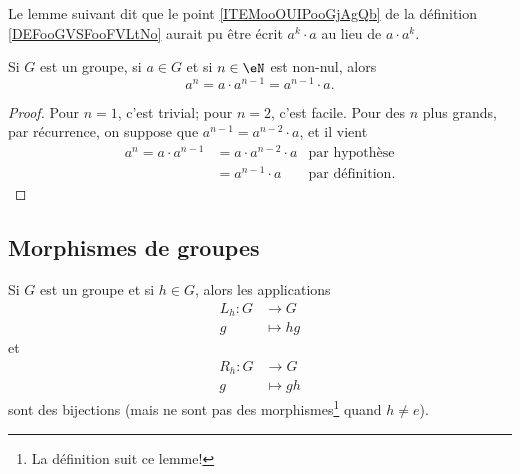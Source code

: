 Le lemme suivant dit que le point \ref{ITEMooOUIPooGjAgQb} de la définition \ref{DEFooGVSFooFVLtNo} aurait pu être écrit \( a^k\cdot a\) au lieu de \( a\cdot a^k\).
\begin{lemma}        \label{LEMooWPARooYLZlzr}
    Si \( G\) est un groupe, si \( a\in G \) et si \( n\in \eN\) est non-nul, alors
    \begin{equation}
        a^n=a\cdot a^{n-1}=a^{n-1}\cdot a.
    \end{equation}
\end{lemma}
\begin{proof}
Pour \( n = 1 \), c'est trivial; pour \( n = 2 \), c'est facile. Pour des \( n \) plus grands, par récurrence, on suppose que \( a^{n-1} = a^{n-2}\cdot a \), et il vient 
\begin{align}
 a^n = a\cdot a^{n-1} &= a\cdot  a^{n-2}\cdot a  &\text{par hypothèse}\\
 & = a^{n-1}\cdot a &\text{par définition}.
 \end{align}
\end{proof}

\subsection{Morphismes de groupes}
\begin{lemma}       \label{LEMooBIBFooBHxFYC}
    Si \( G\) est un groupe et si \( h\in G\), alors les applications
    \begin{equation}
        \begin{aligned}
            L_h\colon G&\to G \\
            g&\mapsto hg 
        \end{aligned}
    \end{equation}
    et
    \begin{equation}
        \begin{aligned}
            R_h\colon G&\to G \\
            g&\mapsto gh 
        \end{aligned}
    \end{equation}
    sont des bijections (mais ne sont pas des morphismes\footnote{La définition suit ce lemme!} quand \(h \neq e \)).
\end{lemma}


